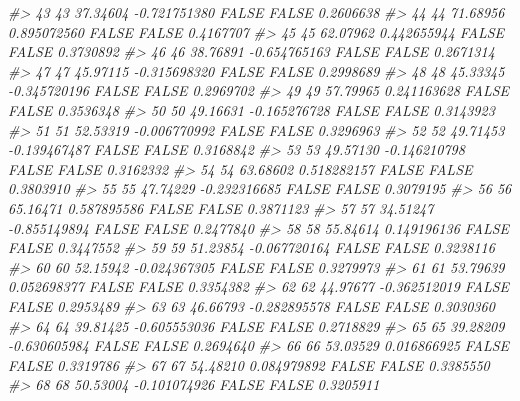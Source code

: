 \documentclass[
  oneside]{book}
\newenvironment{Shaded}{\begin{snugshade}}{\end{snugshade}}
\newcommand{\CommentTok}[1]{\textcolor[rgb]{0.56,0.35,0.01}{\textit{#1}}}
\begin{document}
\begin{Shaded}
\begin{Highlighting}[]
\CommentTok{\#\textgreater{} 43   43  37.34604 {-}0.721751380     FALSE       FALSE        0.2606638}
\CommentTok{\#\textgreater{} 44   44  71.68956  0.895072560     FALSE       FALSE        0.4167707}
\CommentTok{\#\textgreater{} 45   45  62.07962  0.442655944     FALSE       FALSE        0.3730892}
\CommentTok{\#\textgreater{} 46   46  38.76891 {-}0.654765163     FALSE       FALSE        0.2671314}
\CommentTok{\#\textgreater{} 47   47  45.97115 {-}0.315698320     FALSE       FALSE        0.2998689}
\CommentTok{\#\textgreater{} 48   48  45.33345 {-}0.345720196     FALSE       FALSE        0.2969702}
\CommentTok{\#\textgreater{} 49   49  57.79965  0.241163628     FALSE       FALSE        0.3536348}
\CommentTok{\#\textgreater{} 50   50  49.16631 {-}0.165276728     FALSE       FALSE        0.3143923}
\CommentTok{\#\textgreater{} 51   51  52.53319 {-}0.006770992     FALSE       FALSE        0.3296963}
\CommentTok{\#\textgreater{} 52   52  49.71453 {-}0.139467487     FALSE       FALSE        0.3168842}
\CommentTok{\#\textgreater{} 53   53  49.57130 {-}0.146210798     FALSE       FALSE        0.3162332}
\CommentTok{\#\textgreater{} 54   54  63.68602  0.518282157     FALSE       FALSE        0.3803910}
\CommentTok{\#\textgreater{} 55   55  47.74229 {-}0.232316685     FALSE       FALSE        0.3079195}
\CommentTok{\#\textgreater{} 56   56  65.16471  0.587895586     FALSE       FALSE        0.3871123}
\CommentTok{\#\textgreater{} 57   57  34.51247 {-}0.855149894     FALSE       FALSE        0.2477840}
\CommentTok{\#\textgreater{} 58   58  55.84614  0.149196136     FALSE       FALSE        0.3447552}
\CommentTok{\#\textgreater{} 59   59  51.23854 {-}0.067720164     FALSE       FALSE        0.3238116}
\CommentTok{\#\textgreater{} 60   60  52.15942 {-}0.024367305     FALSE       FALSE        0.3279973}
\CommentTok{\#\textgreater{} 61   61  53.79639  0.052698377     FALSE       FALSE        0.3354382}
\CommentTok{\#\textgreater{} 62   62  44.97677 {-}0.362512019     FALSE       FALSE        0.2953489}
\CommentTok{\#\textgreater{} 63   63  46.66793 {-}0.282895578     FALSE       FALSE        0.3030360}
\CommentTok{\#\textgreater{} 64   64  39.81425 {-}0.605553036     FALSE       FALSE        0.2718829}
\CommentTok{\#\textgreater{} 65   65  39.28209 {-}0.630605984     FALSE       FALSE        0.2694640}
\CommentTok{\#\textgreater{} 66   66  53.03529  0.016866925     FALSE       FALSE        0.3319786}
\CommentTok{\#\textgreater{} 67   67  54.48210  0.084979892     FALSE       FALSE        0.3385550}
\CommentTok{\#\textgreater{} 68   68  50.53004 {-}0.101074926     FALSE       FALSE        0.3205911}

\end{Highlighting}
\end{Shaded}
\end{document}
